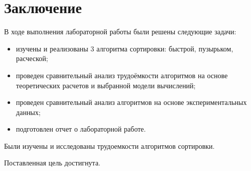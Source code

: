 \chapter*{Заключение}

В ходе выполнения лабораторной работы были решены следующие задачи:

\begin{itemize}
	\item изучены и реализованы 3 алгоритма сортировки: быстрой, пузырьком, расческой;
	\item проведен сравнительный анализ трудоёмкости алгоритмов на основе теоретических расчетов и выбранной модели вычислений;
	\item проведен сравнительный анализ алгоритмов на основе экспериментальных данных;
	\item подготовлен отчет о лабораторной работе.
\end{itemize}

Были изучены и исследованы трудоемкости алгоритмов сортировки. 

Поставленная цель достигнута.

